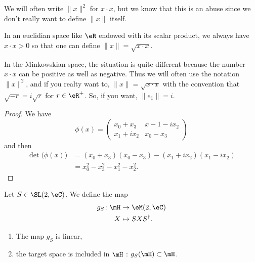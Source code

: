 \begin{normaltext}
	We will often write \( \| x \|^2\) for \( x\cdot x\), but we know that this is an abuse since we don't really want to define \( \| x \|\) itself.

	In an euclidian space like \( \eR\) endowed with its scalar product, we always have \( x\cdot x>0\) so that one can define \( \| x \|=\sqrt{ x\cdot x }\).

	In the Minkowskian space, the situation is quite different because the number \( x\cdot x\) can be positive as well as negative. Thus we will often use the notation \( \| x \|^2\), and if you realty want to, \( \| x \|=\sqrt{ x\cdot x }\) with the convention that \( \sqrt{ - r }=i\sqrt{ r }\) for \( r\in \eR^+\). So, if you want, \( \| e_1 \|=i\).
\end{normaltext}

\begin{proof}
	We have
	\begin{equation}
		\phi(x)=\begin{pmatrix}
			x_0+x_3  & x-1-ix_2 \\
			x_1+ix_2 & x_0-x_3
		\end{pmatrix}
	\end{equation}
	and then
	\begin{subequations}
		\begin{align}
			\det\big( \phi(x) \big) & =(x_0+x_3)(x_0-x_3)-(x_1+ix_2)(x_1-ix_2) \\
			                        & =x_0^2-x_3^2-x_1^2-x_2^2.
		\end{align}
	\end{subequations}
\end{proof}

\begin{lemma}       \label{LEMooHPSJooEVIaoE}
	Let \( S\in \SL(2,\eC)\). We define the map
	\begin{equation}
		\begin{aligned}
			g_S\colon \mH & \to \eM(2,\eC)      \\
			X             & \mapsto SXS^{\dag}.
		\end{aligned}
	\end{equation}
	\begin{enumerate}
		\item
		      The map \( g_S\) is linear,
		\item
		      the target space is included in \( \mH\) : \( g_S(\mH)\subset \mH\).
	\end{enumerate}
\end{lemma}

